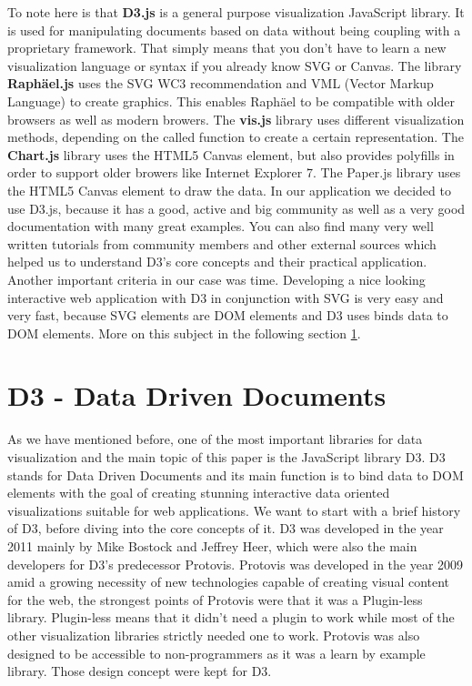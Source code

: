 \documentclass{bioinfo}
\begin{document}
To note here is that \textbf{D3.js} is a general purpose visualization JavaScript library. It is used for manipulating documents based on data without being coupling with a proprietary framework.
That simply means that you don't have to learn a new visualization language or syntax if you already know SVG or Canvas.
\newline
The library \textbf{Raph\"ael.js} uses the SVG WC3 recommendation and VML (Vector Markup Language) to create graphics. This enables Raph\"ael to be compatible with older browsers as well as modern browers.
\newline
The \textbf{vis.js} library uses different visualization methods, depending on the called function to create a certain representation.
\newline
The \textbf{Chart.js} library uses the HTML5 Canvas element, but also provides polyfills in order to support older browers like Internet Explorer 7.
\newline
The Paper.js library uses the HTML5 Canvas element to draw the data.
\newline
In our application we decided to use D3.js, because it has a good, active and big community as well as a very good documentation with many great examples.
You can also find many very well written tutorials from community members and other external sources which helped us to understand D3's core concepts and their practical application.
Another important criteria in our case was time. Developing a nice looking interactive web application with D3 in conjunction with SVG is very easy and very fast, because SVG elements are DOM elements and D3 uses binds data to DOM elements. More on this subject in the following section \ref{s:d3}.



\section{D3 - Data Driven Documents} \label{s:d3}
As we have mentioned before, one of the most important libraries for data visualization and the main topic of this paper is the JavaScript library D3. D3 stands for Data Driven Documents and its main function is to bind data to DOM elements with the goal of creating stunning interactive data oriented visualizations suitable for web applications.
\newline
We want to start with a brief history of D3, before diving into the core concepts of it.
D3 was developed in the year 2011 mainly by Mike Bostock and Jeffrey Heer, which were also the main developers for D3’s predecessor Protovis.
\newline
Protovis was developed in the year 2009 amid a growing necessity of new technologies capable of creating visual content for the web, the strongest points of Protovis were that it was a Plugin-less library. Plugin-less means that it didn’t need a plugin to work while most of the other visualization libraries strictly needed one to work. Protovis was also designed to be accessible to non-programmers as it was a learn by example library.
Those design concept were kept for D3.
\end{document}
